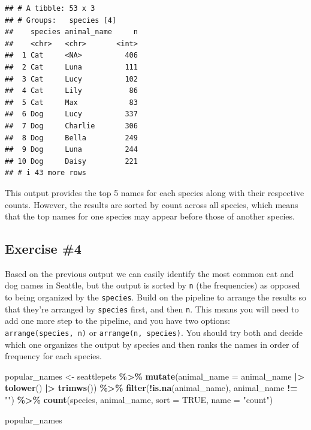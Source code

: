 \documentclass[
]{article}
\newenvironment{Shaded}{\begin{snugshade}}{\end{snugshade}}
\newcommand{\AttributeTok}[1]{\textcolor[rgb]{0.13,0.29,0.53}{#1}}
\newcommand{\ConstantTok}[1]{\textcolor[rgb]{0.56,0.35,0.01}{#1}}
\newcommand{\FunctionTok}[1]{\textcolor[rgb]{0.13,0.29,0.53}{\textbf{#1}}}
\newcommand{\NormalTok}[1]{#1}
\newcommand{\OtherTok}[1]{\textcolor[rgb]{0.56,0.35,0.01}{#1}}
\newcommand{\SpecialCharTok}[1]{\textcolor[rgb]{0.81,0.36,0.00}{\textbf{#1}}}
\newcommand{\StringTok}[1]{\textcolor[rgb]{0.31,0.60,0.02}{#1}}
\begin{document}
\begin{verbatim}
## # A tibble: 53 x 3
## # Groups:   species [4]
##    species animal_name     n
##    <chr>   <chr>       <int>
##  1 Cat     <NA>          406
##  2 Cat     Luna          111
##  3 Cat     Lucy          102
##  4 Cat     Lily           86
##  5 Cat     Max            83
##  6 Dog     Lucy          337
##  7 Dog     Charlie       306
##  8 Dog     Bella         249
##  9 Dog     Luna          244
## 10 Dog     Daisy         221
## # i 43 more rows
\end{verbatim}

This output provides the top 5 names for each species along with their
respective counts. However, the results are sorted by count across all
species, which means that the top names for one species may appear
before those of another species.

\subsection{Exercise \#4}\label{exercise-4}

Based on the previous output we can easily identify the most common cat
and dog names in Seattle, but the output is sorted by \texttt{n} (the
frequencies) as opposed to being organized by the \texttt{species}.
Build on the pipeline to arrange the results so that they're arranged by
\texttt{species} first, and then \texttt{n}. This means you will need to
add one more step to the pipeline, and you have two options:
\texttt{arrange(species,\ n)} or \texttt{arrange(n,\ species)}. You
should try both and decide which one organizes the output by species and
then ranks the names in order of frequency for each species.

\begin{Shaded}
\begin{Highlighting}[]
\NormalTok{popular\_names }\OtherTok{\textless{}{-}}\NormalTok{ seattlepets }\SpecialCharTok{\%\textgreater{}\%}
  \FunctionTok{mutate}\NormalTok{(}\AttributeTok{animal\_name =}\NormalTok{ animal\_name }\SpecialCharTok{|\textgreater{}}
    \FunctionTok{tolower}\NormalTok{() }\SpecialCharTok{|\textgreater{}}
    \FunctionTok{trimws}\NormalTok{()) }\SpecialCharTok{\%\textgreater{}\%}
  \FunctionTok{filter}\NormalTok{(}\SpecialCharTok{!}\FunctionTok{is.na}\NormalTok{(animal\_name), animal\_name }\SpecialCharTok{!=} \StringTok{""}\NormalTok{) }\SpecialCharTok{\%\textgreater{}\%}
  \FunctionTok{count}\NormalTok{(species, animal\_name, }\AttributeTok{sort =} \ConstantTok{TRUE}\NormalTok{, }\AttributeTok{name =} \StringTok{"count"}\NormalTok{)}

\NormalTok{popular\_names}
\end{Highlighting}
\end{Shaded}
\end{document}
